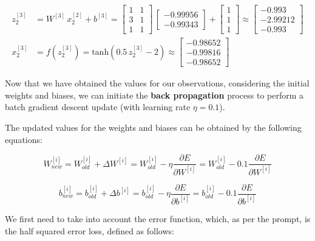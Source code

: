 \documentclass[12pt]{article}
\begin{document}
\begin{enumerate}[leftmargin=\labelsep]
\begin{align*}
                z^{[3]}_2 &= {W}^{[3]} \, {x}^{[2]}_2 + {b}^{[3]} = \begin{bmatrix} 1 & 1 \\ 3 & 1 \\ 1 & 1\end{bmatrix} \,  \begin{bmatrix} -0.99956 \\ -0.99343\end{bmatrix} +
                \begin{bmatrix} 1 \\ 1 \\ 1\end{bmatrix} \approx \begin{bmatrix} -0.993 \\ -2.99212 \\ -0.993\end{bmatrix} \\
                {x}^{[3]}_2 &= f\left({z}^{[3]}_2\right) = \text{tanh}\left(0.5\,{z}^{[3]}_2 - 2\right) \approx \begin{bmatrix} -0.98652 \\ -0.99816 \\ -0.98652\end{bmatrix}
            \end{align*}
            \endgroup

          Now that we have obtained the values for our observations, considering the initial weights and biases, we can initiate the \textbf{back propagation} process
          to perform a batch gradient descent update (with learning rate $\eta = 0.1$).

          The updated values for the weights and biases can be obtained by the following equations:

          \begin{equation}\label{ex2-new-weight}
              W^{[i]}_{new} = W^{[i]}_{old} + \Delta W^{[i]} = W^{[i]}_{old} - \eta \frac{\partial E}{\partial W^{[i]}} = W^{[i]}_{old} - 0.1 \frac{\partial E}{\partial W^{[i]}}
          \end{equation}

          \begin{equation}\label{ex2-new-bias}
              b^{[i]}_{new} = b^{[i]}_{old} + \Delta b^{[i]} = b^{[i]}_{old} - \eta \frac{\partial E}{\partial b^{[i]}} = b^{[i]}_{old} - 0.1 \frac{\partial E}{\partial b^{[i]}}
          \end{equation}

          We first need to take into account the error function, which, as per the prompt, is the half squared error loss, defined as follows:


\end{enumerate}
\end{document}
